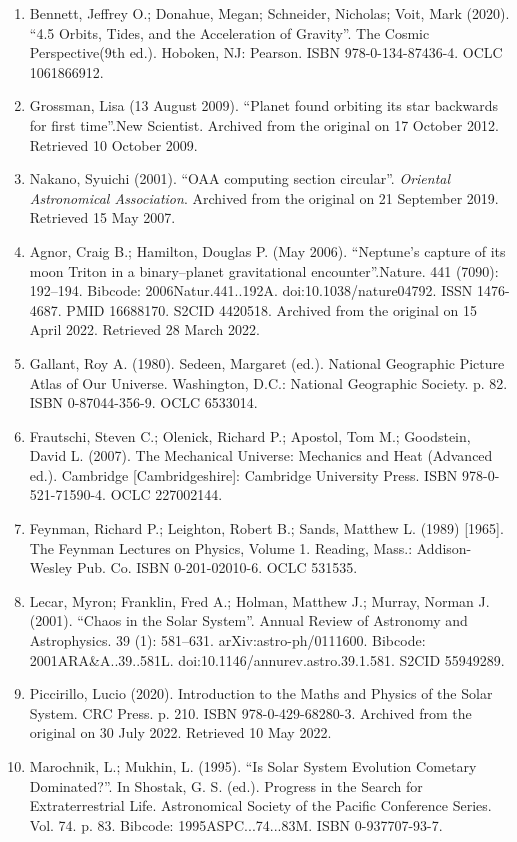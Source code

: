 \begin{enumerate}
\item Bennett, Jeffrey O.; Donahue, Megan; Schneider, Nicholas; Voit, Mark (2020). ``4.5 Orbits, Tides, and the Acceleration of Gravity''. The Cosmic Perspective(9th ed.). Hoboken, NJ: Pearson. ISBN 978-0-134-87436-4. OCLC 1061866912.
\item Grossman, Lisa (13 August 2009). ``Planet found orbiting its star backwards for first time''.New Scientist. Archived from the original on 17 October 2012. Retrieved 10 October 2009.
\item Nakano, Syuichi (2001). ``OAA computing section circular''. \textit{Oriental Astronomical Association}. Archived from the original on 21 September 2019. Retrieved 15 May 2007.
\item Agnor, Craig B.; Hamilton, Douglas P. (May 2006). ``Neptune's capture of its moon Triton in a binary–planet gravitational encounter''.Nature. 441 (7090): 192–194. Bibcode: 2006Natur.441..192A. doi:10.1038/nature04792. ISSN 1476-4687. PMID 16688170. S2CID 4420518. Archived from the original on 15 April 2022. Retrieved 28 March 2022.
\item Gallant, Roy A. (1980). Sedeen, Margaret (ed.). National Geographic Picture Atlas of Our Universe. Washington, D.C.: National Geographic Society. p. 82. ISBN 0-87044-356-9. OCLC 6533014.
\item Frautschi, Steven C.; Olenick, Richard P.; Apostol, Tom M.; Goodstein, David L. (2007). The Mechanical Universe: Mechanics and Heat (Advanced ed.). Cambridge [Cambridgeshire]: Cambridge University Press. ISBN 978-0-521-71590-4. OCLC 227002144.
\item Feynman, Richard P.; Leighton, Robert B.; Sands, Matthew L. (1989) [1965]. The Feynman Lectures on Physics, Volume 1. Reading, Mass.: Addison-Wesley Pub. Co. ISBN 0-201-02010-6. OCLC 531535.
\item Lecar, Myron; Franklin, Fred A.; Holman, Matthew J.; Murray, Norman J. (2001). ``Chaos in the Solar System''. Annual Review of Astronomy and Astrophysics. 39 (1): 581–631. arXiv:astro-ph/0111600. Bibcode: 2001ARA\&A..39..581L. doi:10.1146/annurev.astro.39.1.581. S2CID 55949289.
\item Piccirillo, Lucio (2020). Introduction to the Maths and Physics of the Solar System. CRC Press. p. 210. ISBN 978-0-429-68280-3. Archived from the original on 30 July 2022. Retrieved 10 May 2022.
\item Marochnik, L.; Mukhin, L. (1995). ``Is Solar System Evolution Cometary Dominated?''. In Shostak, G. S. (ed.). Progress in the Search for Extraterrestrial Life. Astronomical Society of the Pacific Conference Series. Vol. 74. p. 83. Bibcode: 1995ASPC...74...83M. ISBN 0-937707-93-7.

\end{enumerate}
